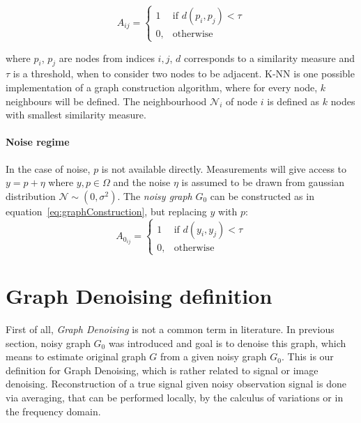 \begin{equation}
    \label{eq:graphConstruction}
    A_{ij} =    
    \begin{cases}
        1  & \text{if } d(p_i, p_j) < \tau\\
        0, & \text{otherwise}
    \end{cases}
\end{equation}

where $p_i$, $p_j$ are nodes from indices $i,j$, $d$ corresponds to a similarity measure and $\tau$ is a threshold, 
when to consider two nodes to be adjacent.
K-NN is one possible implementation of a graph construction algorithm, 
where for every node, $k$ neighbours will be defined.
The neighbourhood $\mathcal{N}_i$ of node $i$ is defined as $k$ nodes with smallest similarity measure.

\paragraph{Noise regime}
In the case of noise, $p$ is not available directly.
Measurements will give access to $y = p + \eta$ where $y,p \in \Omega$ and the noise $\eta$ is assumed to be drawn from gaussian distribution $\mathcal{N} \sim (0,\sigma^2)$.
The \textit{noisy graph} $G_0$ can be constructed as in equation~\ref{eq:graphConstruction}, but replacing $y$ with $p$:
\begin{equation}
    \label{eq:graphConstructionNoise}
    A_{0_{ij}} =    
    \begin{cases}
        1  & \text{if } d(y_i, y_j) < \tau\\
        0, & \text{otherwise}
    \end{cases}
\end{equation}


\section{Graph Denoising definition}

First of all, \textit{Graph Denoising} is not a common term in literature.
In previous section, noisy graph $G_0$ was introduced and goal is to denoise this graph,
which means to estimate original graph $G$ from a given noisy graph $G_0$. 
This is our definition for Graph Denoising, which is rather related to signal or image denoising.
Reconstruction of a true signal given noisy observation signal is done via averaging, that can be performed
locally, by the calculus of variations or in the frequency domain\cite{noneLocalMean}. 

